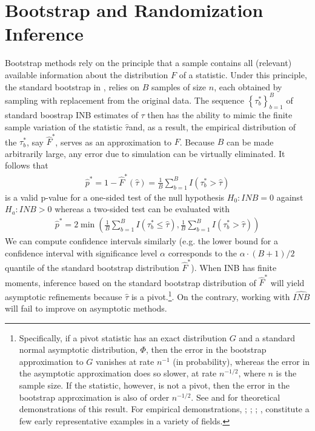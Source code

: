 \documentclass[english, 11pt,a4paper, ]{article}
\begin{document}
\section{Bootstrap and Randomization Inference}
Bootstrap methods rely on the principle that a sample contains all (relevant) available information about the distribution $F$ of a statistic. Under this principle, the standard bootstrap in \cite{Efron1979AoS}, relies on $B$ samples of size $n$, each obtained by sampling with replacement from the original data. The sequence $\left\{\tau^*_b\right\}_{b=1}^B$ of standard boostrap INB estimates of $\tau$ then has the ability to mimic the finite sample variation of the statistic $\hat{\tau}$and, as a result, the empirical distribution of the $\tau^*_b$, say $\hat{F}^*$, serves as an approximation to $F$. Because $B$ can be made arbitrarily large, any error due to simulation can be virtually eliminated. It follows that 
\begin{align}
	\hat{p}^* = 1- \hat{F}^*(\hat{\tau})= \frac{1}{B}\sum_{b=1}^B I(\tau^*_b>\hat{\tau})
\end{align}
is a valid p-value for a one-sided test of the null hypothesis $H_0:INB=0$ against $H_a:INB >0$ whereas a two-sided test can be evaluated with
\begin{align}
	\hat{p}^* = 2 \min\left(\frac{1}{B}\sum_{b=1}^B I(\tau^*_b\leq \hat{\tau}), \frac{1}{B}\sum_{b=1}^B I(\tau^*_b>\hat{\tau})  \right)
\end{align}
We can compute confidence intervals similarly (e.g. the lower bound for a confidence interval with significance level $\alpha$ corresponds to the $\alpha \cdot (B+1)/2$ quantile of the standard bootstrap distribution $\hat{F}^*$). When INB has finite moments, inference based on the standard bootstrap distribution of $\hat{F}^*$ will yield asymptotic refinements because $\hat{\tau}$ is a pivot.\footnote{Specifically, if a pivot statistic has an exact distribution $G$ and a standard normal asymptotic distribution, $\Phi$, then the error in the bootstrap approximation to $G$ vanishes at rate $n^{-1}$ (in probability), whereas the error in the asymptotic approximation does so slower, at rate $n^{-1/2}$, where $n$ is the sample size. If the statistic, however, is not a pivot, then the error in the bootstrap approximation is also of order $n^{-1/2}$. See \cite{beran1988AoS} \cite{Hall1992Book} and \cite{DavidsonHinkley1997Book} for theoretical demonstrations of this result. For empirical demonstrations, \cite{Orme90}; \cite{davidsonFlachaire2007joe}; \cite{CameronGelbachMiller2008REStat}; 
\cite{bugni2010econometrica}, constitute a few early representative examples in a variety of fields.}. On the contrary, working with $\hat{INB}$ will fail to improve on asymptotic methods. 
\end{document}
